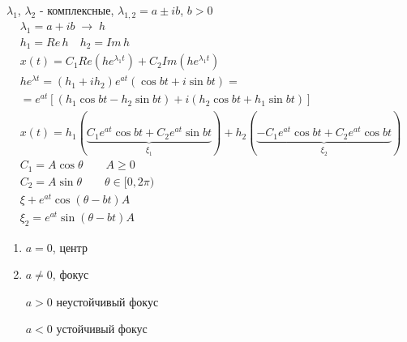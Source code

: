 \documentclass{article}
\begin{document}
\hr
  $\lambda_1$, $\lambda_2$ - комплексные, $\lambda_{1,2}=a\pm ib$, $b>0$
    \begin{gather*}
      \lambda_1=a+ib \; \rightarrow \; h\\ 
      h_1=Re\, h \quad h_2=Im \, h \\ 
      x(t)=C_1 Re(he^{\lambda_1 t}) + C_2 Im(he^{\lambda_1t}) \\ 
      he^{\lambda t}=(h_1+ih_2)e^{at}(\cos bt + i\sin bt)= \\ 
      =e^{at}[(h_1\cos bt - h_2 \sin bt)+i(h_2\cos bt + h_1 \sin bt)] \\ 
      x(t)=h_1( \underbrace{C_1e^{at}\cos bt + C_2 e^{at} \sin bt}_{\xi_1}) + h_2 (\underbrace{-C_1 e^{at}\cos bt + C_2 e^{at} \cos bt}_{\xi_2} ) \\ 
      C_1 = A\cos \theta \qquad A\ge 0 \\ 
      C_2= A\sin \theta \qquad \theta \in [0, 2\pi) \\ 
      \xi + e^{at}\cos (\theta-bt)A \\ 
      \xi_2=e^{at}\sin (\theta-bt)A
    \end{gather*}
    \begin{enumerate}
      \item $a=0$, центр

      \item $a\neq 0$, фокус


        $a>0$ неустойчивый фокус

        $a<0$ устойчивый фокус
    \end{enumerate}
\end{document}
